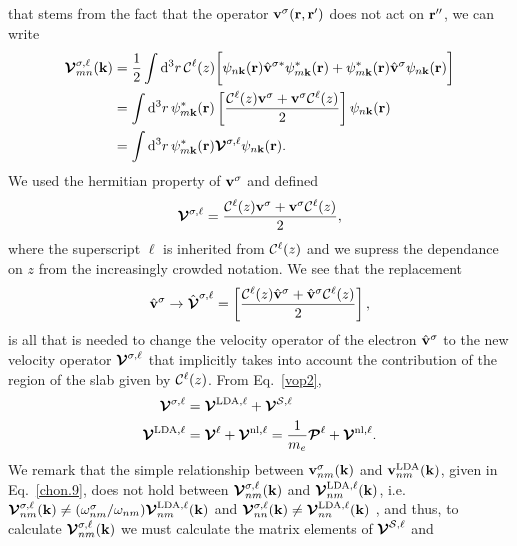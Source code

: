 \documentclass[floatfix,prb,aps,superscriptaddress,11pt,preprint,letterpaper]{revtex4}
\begin{document}
that stems from the fact that the operator $\mathbf{v}^\sigma(\mathbf{r},\mathbf{r}')$ does not act on
$\mathbf{r}''$, we can write
\begin{align}\label{nl.3}
\boldsymbol{\mathcal{\cal V}}^{\sigma,\ell}_{mn}({\mathbf k})
&=
\frac{1}{2}
\int \mathrm{d}^3 r\,
 {\mathbf{\cal C}}^\ell(z)
 \bigg[
\psi_{n\mathbf{k}}(\mathbf{r})
\hat{\mathbf{v}}^{\sigma *}\psi^*_{m\mathbf{k}}(\mathbf{r})
+ 
\psi^*_{m\mathbf{k}}(\mathbf{r})\hat{\mathbf{v}}^\sigma
\psi_{n\mathbf{k}}(\mathbf{r})
\bigg]
\nonumber\\
&=
\int \mathrm{d}^3 r\,
\psi^*_{m\mathbf{k}}(\mathbf{r})
\left[\frac{{\mathbf{\cal C}}^\ell(z) \mathbf{v}^\sigma +
\mathbf{v}^\sigma {\mathbf{\cal C}}^\ell(z)}{2}\right]
\psi_{n\mathbf{k}}(\mathbf{r})
\nonumber\\
&=
\int \mathrm{d}^3 r\,
\psi^*_{m\mathbf{k}}(\mathbf{r})
\boldsymbol{\mathcal{\cal V}}^{\sigma,\ell}
\psi_{n\mathbf{k}}(\mathbf{r})
.
\end{align}
We used the hermitian property of $\mathbf{v}^\sigma$ and defined
\begin{align}\label{nl.4}
\boldsymbol{\mathcal{\cal V}}^{\sigma,\ell}
=
\frac{{\mathbf{\cal C}}^\ell(z) \mathbf{v}^\sigma +
\mathbf{v}^\sigma {\mathbf{\cal C}}^\ell(z)}{2}
,
\end{align} 
where the superscript $\ell$ is inherited from ${\mathbf{\cal C}}^\ell(z)$ and we
supress the dependance on $z$ from the increasingly crowded notation.  
We see that the replacement
\begin{align}\label{vcali}
\hat{\mathbf{v}}^\sigma \to \hat{\boldsymbol{\mathcal{\cal V}}}^{\sigma,\ell}=\left[\frac{{\mathbf{\cal C}}^\ell(z) \hat{\mathbf{v}}^\sigma +
\hat{\mathbf{v}}^\sigma {\mathbf{\cal C}}^\ell(z)}{2}\right]
,
\end{align} 
is all that is needed to change the
velocity operator of the electron $\hat{\mathbf{v}}^\sigma$ to the new velocity
operator $\boldsymbol{\mathcal{\cal V}}^{\sigma,\ell}$ that implicitly takes into account the
contribution of the region of the slab given by ${\mathbf{\cal C}}^\ell(z)$.
From Eq.~\eqref{vop2},
\begin{align}\label{vopii}
\boldsymbol{\mathcal{\cal V}}^{\sigma,\ell}
&=
\boldsymbol{\mathcal{\cal V}}^{\mathrm{LDA},\ell}
+
\boldsymbol{\mathcal{\cal V}}^{{\cal S},\ell}
\nonumber\\
\boldsymbol{\mathcal{\cal V}}^{\mathrm{LDA},\ell}
&=
\boldsymbol{\mathcal{\cal V}}^{\ell}
+
\boldsymbol{\mathcal{\cal V}}^{\mathrm{nl},\ell}
=
\frac{1}{m_e}
\boldsymbol{\mathcal{\cal P}}^{\ell}
+
\boldsymbol{\mathcal{\cal V}}^{\mathrm{nl},\ell}
.
\end{align}
We remark that the simple relationship between 
$\mathbf{v}^{\sigma}_{nm}(\mathbf{k})$ 
and 
$\mathbf{v}^{\mathrm{LDA}}_{nm}(\mathbf{k})$,
given in 
Eq.~\eqref{chon.9}, 
does not hold between
$\boldsymbol{\mathcal{\cal V}}^{\sigma,\ell}_{nm}(\mathbf{k})$   
and 
$\boldsymbol{\mathcal{\cal V}}^{\mathrm{LDA},\ell}_{nm}(\mathbf{k})$,
i.e.
$\boldsymbol{\mathcal{\cal V}}^{\sigma,\ell}_{nm}(\mathbf{k})\ne
(\omega^\sigma_{nm}/\omega_{nm})
\boldsymbol{\mathcal{\cal V}}^{\mathrm{LDA},\ell}_{nm}(\mathbf{k})$ 
and
$\boldsymbol{\mathcal{\cal V}}^{\sigma,\ell}_{nn}(\mathbf{k})\ne
\boldsymbol{\mathcal{\cal V}}^{\mathrm{LDA},\ell}_{nn}(\mathbf{k})$
,
and thus, to calculate
$\boldsymbol{\mathcal{\cal V}}^{\sigma,\ell}_{nm}(\mathbf{k})$ 
we must calculate the matrix elements of $\boldsymbol{\mathcal{\cal V}}^{{\cal S},\ell}$ and
\end{document}
